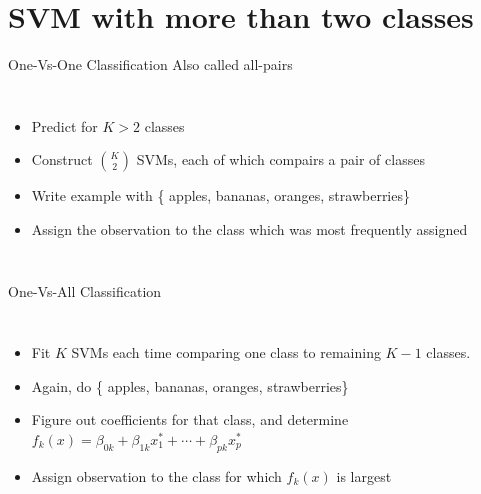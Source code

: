 \documentclass[aspectratio=169,usenames,dvipsnames]{beamer}
\newcommand{\InstructorList}[1]{
\begin{itemize}
	\color{orange}
	#1
\end{itemize}
}
\begin{document}
\section{SVM with more than two classes}

\begin{frame}[t]{One-Vs-One Classification}
	{Also called all-pairs}

\begin{columns}
\centering
\InstructorList{
  \item
Predict for $K>2$ classes
\item Construct $\binom{K}{2}$ SVMs, each of which compairs a pair of classes
\item Write example with \{ apples, bananas, oranges, strawberries\}
\item Assign the observation to the class which was most frequently assigned
}



\centering

\end{columns}

\end{frame}

\begin{frame}[t]{One-Vs-All Classification}

\begin{columns}
\centering
\InstructorList{
  \item Fit $K$ SVMs each time comparing one class to remaining $K-1$ classes.
	\item Again, do  \{ apples, bananas, oranges, strawberries\}
	\item Figure out coefficients for that class, and determine $f_k(x) = \beta_{0k} + \beta_{1k}x_1^* + \cdots + \beta_{pk}x_p^*$
	\item Assign observation to the class for which $f_k(x)$ is largest
}

\centering

\end{columns}

\end{frame}
\end{document}
